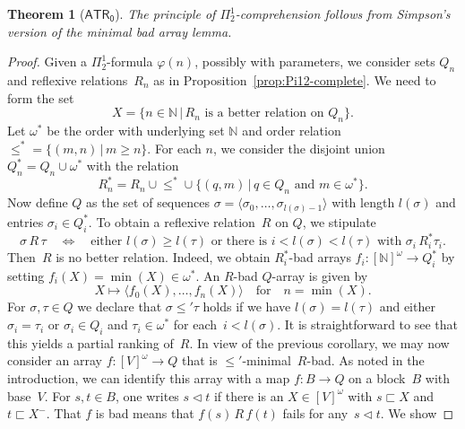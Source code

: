 \documentclass{amsart}
\newtheorem{theorem}{Theorem}
\numberwithin{theorem}{section}
\theoremstyle{definition}
\begin{document}
\begin{theorem}[$\mathsf{ATR_0}$]\label{thm:mba-to-Pi12CA}
The principle of $\Pi^1_2$-comprehension follows from Simpson's version of the minimal bad array lemma.
\end{theorem}
\begin{proof}
    Given a $\Pi^1_2$-formula $\varphi(n)$, possibly with parameters, we consider sets $Q_n$ and reflexive relations~$R_n$ as in Proposition~\ref{prop:Pi12-complete}. We need to form the set
    \begin{equation*}
        X=\{n\in\mathbb N\,|\,R_n\text{ is a better relation on }Q_n\}.
    \end{equation*}
    Let $\omega^*$ be the order with underlying set $\mathbb N$ and order relation~${\leq^*}=\{(m,n)\,|\,m\geq n\}$. For each $n$, we consider the disjoint union $Q_n^*=Q_n\cup\omega^*$ with the relation
    \begin{equation*}
    R_n^*=R_n\cup{\leq^*}\cup\{(q,m)\,|\,q\in Q_n\text{ and }m\in\omega^*\}.
    \end{equation*} 
    Now define $Q$ as the set of sequences $\sigma=\langle\sigma_0,\ldots,\sigma_{l(\sigma)-1}\rangle$ with length $l(\sigma)$ and entries $\sigma_i\in Q_i^*$. To obtain a reflexive relation~$R$ on $Q$, we stipulate
    \begin{equation*}
        \sigma\,R\,\tau\quad\Leftrightarrow\quad\text{either $l(\sigma)\geq l(\tau)$ or there is $i<l(\sigma)<l(\tau)$ with $\sigma_i\,R_i^*\tau_i$}.
    \end{equation*}
    Then~$R$ is no better relation. Indeed, we obtain $R_i^*$-bad arrays $f_i:[\mathbb N]^\omega\to Q_i^*$ by setting $f_i(X)=\min(X)\in\omega^*$. An $R$-bad $Q$-array is given by
    \begin{equation*}
     X\mapsto\langle f_0(X),\ldots,f_n(X)\rangle\quad\text{for}\quad n=\min(X).
    \end{equation*}
For $\sigma,\tau\in Q$ we declare that $\sigma\leq'\tau$ holds if we have $l(\sigma)=l(\tau)$ and either $\sigma_i=\tau_i$ or $\sigma_i\in Q_i$ and $\tau_i\in\omega^*$ for each~$i<l(\sigma)$. It is straightforward to see that this yields a partial ranking of~$R$. In view of the previous corollary, we may now consider an array $f:[V]^\omega\to Q$ that is $\leq'$-minimal~$R$-bad. As noted in the introduction, we can identify this array with a map $f:B\to Q$ on a block~$B$ with base~$V$. For $s,t\in B$, one writes $s\vartriangleleft t$ if there is an $X\in[V]^\omega$ with $s\sqsubset X$ and $t\sqsubset X^-$. That $f$ is bad means that $f(s)\,R\,f(t)$ fails for any~$s\vartriangleleft t$. We show

\end{proof}
\end{document}
